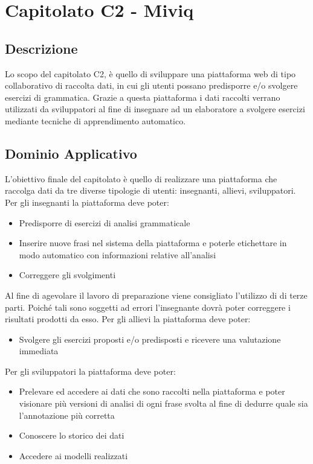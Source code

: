 \clearpage
\section{Capitolato C2 - Miviq}
\subsection{Descrizione}
Lo scopo del capitolato C2, è quello di sviluppare una piattaforma web di tipo collaborativo di raccolta dati, in cui gli utenti possano predisporre e/o svolgere esercizi di grammatica. Grazie a questa piattaforma i dati raccolti verrano utilizzati da sviluppatori al fine di insegnare ad un elaboratore a svolgere esercizi mediante tecniche di apprendimento automatico.

\subsection{Dominio Applicativo}
L'obiettivo finale del capitolato è quello di realizzare una piattaforma che raccolga dati da tre diverse tipologie di utenti: insegnanti, allievi, sviluppatori.
Per gli insegnanti la piattaforma deve poter:
\begin{itemize}
		\item Predisporre di esercizi di analisi grammaticale
		\item Inserire nuove frasi nel sistema della piattaforma e poterle etichettare in modo automatico con informazioni relative all'analisi
		\item Correggere gli svolgimenti
\end{itemize}
Al fine di agevolare il lavoro di preparazione viene consigliato l'utilizzo di  di terze parti. Poiché tali  sono soggetti ad errori l'insegnante dovrà poter correggere i risultati prodotti da esso.
Per gli allievi la piattaforma deve poter:
\begin{itemize}
		\item Svolgere gli esercizi proposti e/o predisposti e ricevere una valutazione immediata
\end{itemize}

Per gli sviluppatori la piattaforma deve poter:
\begin{itemize}
		\item Prelevare ed accedere ai dati che sono raccolti nella piattaforma e poter visionare più versioni di analisi di ogni frase svolta al fine di dedurre quale sia l'annotazione più corretta
		\item Conoscere lo storico dei dati
		\item Accedere ai modelli realizzati
\end{itemize}

